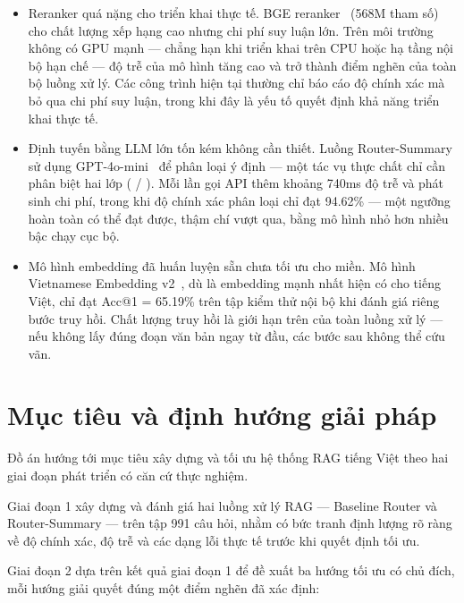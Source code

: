 \documentclass[../DoAn.tex]{subfiles}
\begin{document}
\begin{itemize}
    \item Reranker quá nặng cho triển khai thực tế. BGE reranker~\cite{bge_reranker_v2_m3} (568M tham số) cho chất lượng xếp hạng cao nhưng chi phí suy luận lớn. Trên môi trường không có GPU mạnh --- chẳng hạn khi triển khai trên CPU hoặc hạ tầng nội bộ hạn chế --- độ trễ của mô hình tăng cao và trở thành điểm nghẽn của toàn bộ luồng xử lý. Các công trình hiện tại thường chỉ báo cáo độ chính xác mà bỏ qua chi phí suy luận, trong khi đây là yếu tố quyết định khả năng triển khai thực tế.

    \item Định tuyến bằng LLM lớn tốn kém không cần thiết. Luồng Router-Summary sử dụng GPT-4o-mini~\cite{openai2024gpt4omini} để phân loại ý định --- một tác vụ thực chất chỉ cần phân biệt hai lớp ( / ). Mỗi lần gọi API thêm khoảng 740ms độ trễ và phát sinh chi phí, trong khi độ chính xác phân loại chỉ đạt 94.62\% --- một ngưỡng hoàn toàn có thể đạt được, thậm chí vượt qua, bằng mô hình nhỏ hơn nhiều bậc chạy cục bộ.

    \item Mô hình embedding đã huấn luyện sẵn chưa tối ưu cho miền. Mô hình Vietnamese Embedding v2~\cite{aiteamvn_embedding}, dù là embedding mạnh nhất hiện có cho tiếng Việt, chỉ đạt Acc@1 = 65.19\% trên tập kiểm thử nội bộ khi đánh giá riêng bước truy hồi. Chất lượng truy hồi là giới hạn trên của toàn luồng xử lý --- nếu không lấy đúng đoạn văn bản ngay từ đầu, các bước sau không thể cứu vãn.
\end{itemize}

\section{Mục tiêu và định hướng giải pháp}
\label{section:1.3}

Đồ án hướng tới mục tiêu xây dựng và tối ưu hệ thống RAG tiếng Việt theo hai giai đoạn phát triển có căn cứ thực nghiệm.

Giai đoạn 1 xây dựng và đánh giá hai luồng xử lý RAG --- Baseline Router và Router-Summary --- trên tập 991 câu hỏi, nhằm có bức tranh định lượng rõ ràng về độ chính xác, độ trễ và các dạng lỗi thực tế trước khi quyết định tối ưu.

Giai đoạn 2 dựa trên kết quả giai đoạn 1 để đề xuất ba hướng tối ưu có chủ đích, mỗi hướng giải quyết đúng một điểm nghẽn đã xác định:
\end{document}
